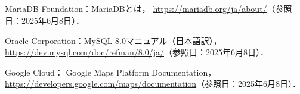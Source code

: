 \begin{center}
	\section*{}                      %
	\vspace*{-2zh}
\end{center}

\begin{thebibliography}{99}

	MariaDB Foundation：MariaDBとは，
	\url{https://mariadb.org/ja/about/}（参照日：2025年6月8日）．

	Oracle Corporation：MySQL 8.0マニュアル（日本語訳），
	\url{https://dev.mysql.com/doc/refman/8.0/ja/}（参照日：2025年6月8日）．

	Google Cloud：
	Google Maps Platform Documentation，
	\url{https://developers.google.com/maps/documentation}（参照日：2025年6月8日）．

\end{thebibliography}

